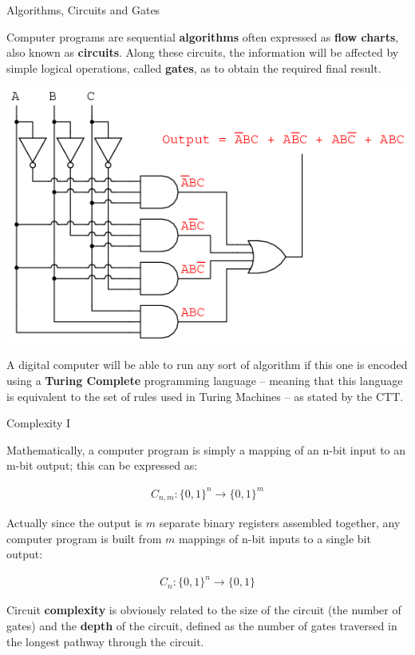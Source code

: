 \documentclass[9pt, handout, aspectratio=169]{beamer}		%
\begin{document}
	\begin{frame}{Algorithms, Circuits and Gates}

		Computer programs are sequential \textbf{algorithms} often expressed as \textbf{flow charts}, also known as \textbf{circuits}. Along these circuits, the information will be affected by simple logical operations, called \textbf{gates}, as to obtain the required final result.

		\begin{center}
		\includegraphics[width=.34\paperwidth]{Figures/Digital_Gates}
		\end{center}

		\pause

		\vspace{4pt}
		A digital computer will be able to run any sort of algorithm if this one is encoded using a \textbf{Turing Complete} programming language -- meaning that this language is equivalent to the set of rules used in Turing Machines -- as stated by the CTT.

	\end{frame}


	\begin{frame}{Complexity I}

		Mathematically, a computer program is simply a mapping of an n-bit input to an m-bit output; this can be expressed as:

		\begin{align*}
			C_{n,m}:\lbrace 0,1 \rbrace^n \rightarrow \lbrace 0,1 \rbrace^m
		\end{align*}

		Actually since the output is $m$ separate binary registers assembled together, any computer program is built from $m$ mappings of n-bit inputs to a single bit output:

		\begin{align*}
			C_{n}:\lbrace 0,1 \rbrace^n \rightarrow \lbrace 0,1 \rbrace
		\end{align*}

		\pause

		Circuit \textbf{complexity} is obviously related to the size of the circuit (the number of gates) and the \textbf{depth} of the circuit, defined as the number of gates traversed in the longest pathway through the circuit.

	\end{frame}
\end{document}
